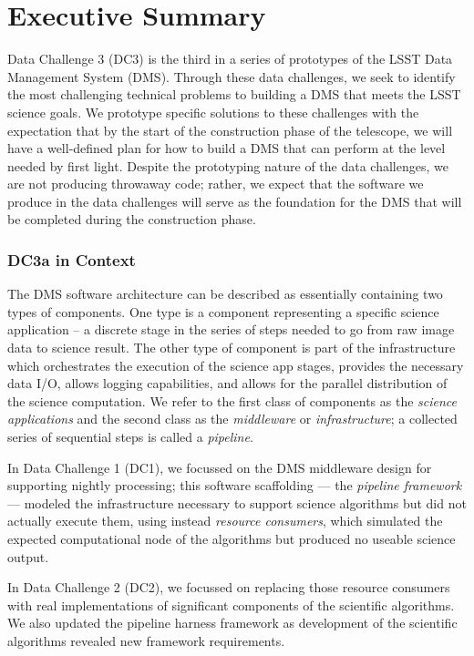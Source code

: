 \pagebreak
\section*{Executive Summary}

Data Challenge 3 (DC3) is the third in a series of prototypes of the LSST Data Management
System (DMS). Through these data challenges, we seek to identify the most challenging technical
problems to building a DMS that meets the LSST science goals. We prototype specific solutions to
these challenges with the expectation that by the start of the construction phase of the telescope,
we will have a well-defined plan for how to build a DMS that can perform at the level needed by
first light. Despite the prototyping nature of the data challenges, we are not producing throwaway
code; rather, we expect that the software we produce in the data challenges will serve as the
foundation for the DMS that will be completed during the construction phase.

\subsubsection*{DC3a in Context}

The DMS software architecture can be described as essentially containing
two types of components. One type is a component representing a specific
science application -- a discrete stage in the series of steps needed to
go from raw image data to science result. The other type of component 
is part of the infrastructure which orchestrates the execution of the science app 
stages, provides the necessary data I/O, allows logging capabilities, and allows 
for the parallel distribution of the science computation. We refer to the first
class of components as the \textit{science applications} and the second class
as the \textit{middleware} or \textit{infrastructure}; a collected series of
sequential steps is called a \textit{pipeline}.

In Data Challenge 1 (DC1), we focussed on the DMS middleware design for 
supporting nightly processing; this software scaffolding --- the \textit{pipeline
framework} --- modeled the 
infrastructure necessary to support science algorithms but did not actually
execute them, using instead \textit{resource consumers},
which simulated the expected computational node of the algorithms but
produced no useable science output. 

In Data Challenge 2 (DC2), we focussed on replacing those resource consumers 
with real implementations of significant components of the scientific algorithms.
We also updated the pipeline harness framework as development of the
scientific algorithms revealed new framework requirements. 

